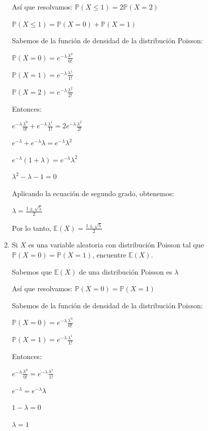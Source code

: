 \documentclass[11pt,a4paper]{report}
\begin{document}
\begin{enumerate}
{			Así que resolvamos: $\mathbb{P}(X \leq 1) = 2\mathbb{P}(X = 2)$

			$\mathbb{P}(X \leq 1) = \mathbb{P}(X = 0) + \mathbb{P}(X = 1)$

			Sabemos de la función de densidad de la distribución Poisson:

			$\mathbb{P}(X = 0) = e^{-\lambda} \frac{\lambda^{0}}{0!}$

			$\mathbb{P}(X = 1) = e^{-\lambda} \frac{\lambda^{1}}{1!}$

			$\mathbb{P}(X = 2) = e^{-\lambda} \frac{\lambda^{2}}{2!}$

			Entonces:

			$e^{-\lambda} \frac{\lambda^{0}}{0!} + e^{-\lambda} \frac{\lambda^{1}}{1!} = 2 e^{-\lambda} \frac{\lambda^{2}}{2!}$

			$e^{-\lambda}  + e^{-\lambda} \lambda =  e^{-\lambda} \lambda^{2}$

			$e^{-\lambda} (1 + \lambda) =  e^{-\lambda} \lambda^{2}$

			 $\lambda^{2} - \lambda - 1 = 0$

			 Aplicando la ecuación de segundo grado, obtenemos:

			 $\lambda = \frac{1 \pm \sqrt{5}}{2}$

			 Por lo tanto, $ \mathbb{E}(X) = \frac{1 \pm \sqrt{5}}{2}$\\

		}

		\item{
			Si $X$ es una variable aleatoria con distribución Poisson tal que
			$\mathbb{P}(X = 0) = \mathbb{P}(X = 1)$, encuentre $\mathbb{E}(X)$.

			Sabemos que $\mathbb{E}(X)$ de una distribución Poisson es $\lambda$

			Así que resolvamos: $\mathbb{P}(X = 0) = \mathbb{P}(X = 1)$

			Sabemos de la función de densidad de la distribución Poisson:

			$\mathbb{P}(X = 0) = e^{-\lambda} \frac{\lambda^{0}}{0!}$

			$\mathbb{P}(X = 1) = e^{-\lambda} \frac{\lambda^{1}}{1!}$


			Entonces:

			$e^{-\lambda} \frac{\lambda^{0}}{0!} = e^{-\lambda} \frac{\lambda^{1}}{1!}$

			$e^{-\lambda}  =  e^{-\lambda} \lambda$

			$1 - \lambda =  0$

			$\lambda = 1$

}
\end{enumerate}
\end{document}
